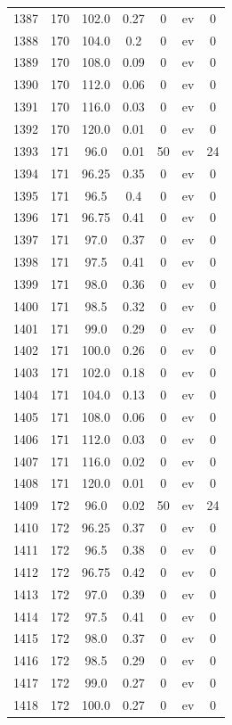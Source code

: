 \documentclass[12pt,a4paper]{article}
\begin{document}
\begin{tabular}{r|cccccc}
	1387 & 170 & 102.0 & 0.27 & 0 & ev & 0 \\
	1388 & 170 & 104.0 & 0.2 & 0 & ev & 0 \\
	1389 & 170 & 108.0 & 0.09 & 0 & ev & 0 \\
	1390 & 170 & 112.0 & 0.06 & 0 & ev & 0 \\
	1391 & 170 & 116.0 & 0.03 & 0 & ev & 0 \\
	1392 & 170 & 120.0 & 0.01 & 0 & ev & 0 \\
	1393 & 171 & 96.0 & 0.01 & 50 & ev & 24 \\
	1394 & 171 & 96.25 & 0.35 & 0 & ev & 0 \\
	1395 & 171 & 96.5 & 0.4 & 0 & ev & 0 \\
	1396 & 171 & 96.75 & 0.41 & 0 & ev & 0 \\
	1397 & 171 & 97.0 & 0.37 & 0 & ev & 0 \\
	1398 & 171 & 97.5 & 0.41 & 0 & ev & 0 \\
	1399 & 171 & 98.0 & 0.36 & 0 & ev & 0 \\
	1400 & 171 & 98.5 & 0.32 & 0 & ev & 0 \\
	1401 & 171 & 99.0 & 0.29 & 0 & ev & 0 \\
	1402 & 171 & 100.0 & 0.26 & 0 & ev & 0 \\
	1403 & 171 & 102.0 & 0.18 & 0 & ev & 0 \\
	1404 & 171 & 104.0 & 0.13 & 0 & ev & 0 \\
	1405 & 171 & 108.0 & 0.06 & 0 & ev & 0 \\
	1406 & 171 & 112.0 & 0.03 & 0 & ev & 0 \\
	1407 & 171 & 116.0 & 0.02 & 0 & ev & 0 \\
	1408 & 171 & 120.0 & 0.01 & 0 & ev & 0 \\
	1409 & 172 & 96.0 & 0.02 & 50 & ev & 24 \\
	1410 & 172 & 96.25 & 0.37 & 0 & ev & 0 \\
	1411 & 172 & 96.5 & 0.38 & 0 & ev & 0 \\
	1412 & 172 & 96.75 & 0.42 & 0 & ev & 0 \\
	1413 & 172 & 97.0 & 0.39 & 0 & ev & 0 \\
	1414 & 172 & 97.5 & 0.41 & 0 & ev & 0 \\
	1415 & 172 & 98.0 & 0.37 & 0 & ev & 0 \\
	1416 & 172 & 98.5 & 0.29 & 0 & ev & 0 \\
	1417 & 172 & 99.0 & 0.27 & 0 & ev & 0 \\
	1418 & 172 & 100.0 & 0.27 & 0 & ev & 0 \\

\end{tabular}
\end{document}
